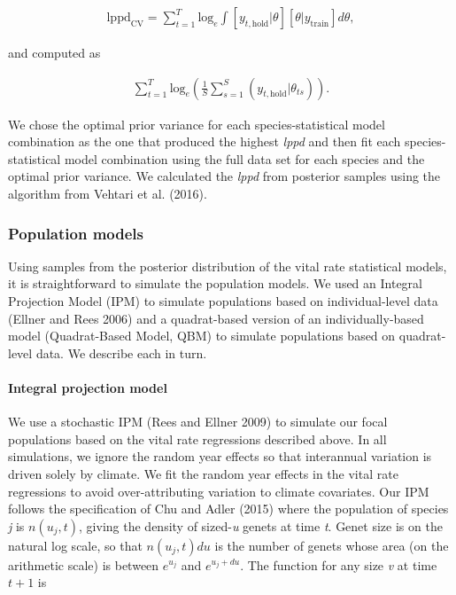 \documentclass[12pt,]{article}
\begin{document}
\vspace{-3em}\begin{align}
\text{lppd}_{\text{CV}} = \sum_{t=1}^T \text{log}_e \int [y_{t,\text{hold}}|\theta][\theta|y_{\text{train}}]d\theta,
\end{align}\vspace{-3em}

and computed as

\vspace{-3em}\begin{align}
\sum_{t=1}^T \text{log}_e \left(\frac{1}{S} \sum^S_{s=1}(y_{t,\text{hold}}|\theta_{ts})  \right).
\end{align}\vspace{-3em}

We chose the optimal prior variance for each species-statistical model
combination as the one that produced the highest \emph{lppd} and then
fit each species-statistical model combination using the full data set
for each species and the optimal prior variance. We calculated the
\emph{lppd} from posterior samples using the algorithm from Vehtari et
al. (2016).

\subsubsection{Population models}\label{population-models}

Using samples from the posterior distribution of the vital rate
statistical models, it is straightforward to simulate the population
models. We used an Integral Projection Model (IPM) to simulate
populations based on individual-level data (Ellner and Rees 2006) and a
quadrat-based version of an individually-based model (Quadrat-Based
Model, QBM) to simulate populations based on quadrat-level data. We
describe each in turn.

\paragraph{Integral projection model}\label{integral-projection-model}

We use a stochastic IPM (Rees and Ellner 2009) to simulate our focal
populations based on the vital rate regressions described above. In all
simulations, we ignore the random year effects so that interannual
variation is driven solely by climate. We fit the random year effects in
the vital rate regressions to avoid over-attributing variation to
climate covariates. Our IPM follows the specification of Chu and Adler
(2015) where the population of species \emph{j} is \(n(u_{j},t)\),
giving the density of sized-\emph{u} genets at time \emph{t}. Genet size
is on the natural log scale, so that \(n(u_{j},t)du\) is the number of
genets whose area (on the arithmetic scale) is between \(e^{u_{j}}\) and
\(e^{u_{j}+du}\). The function for any size \emph{v} at time \(t+1\) is
\end{document}
